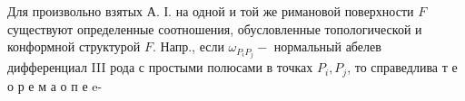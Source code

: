 \documentclass[10pt]{article}
\begin{document}
Для произвольно взятых А. І. на одной и той же римановой поверхности $F$ существуют определенные соотношения, обусловленные топологической и конформной структурой $F$. Напр., если $\omega_{P_{i} P_{j}}-$ нормальный абелев дифференциал III рода с простыми полюсами в точках $P_{i}, P_{j}$, то справедлива т е о р е м а $о$ п е e-
\end{document}
